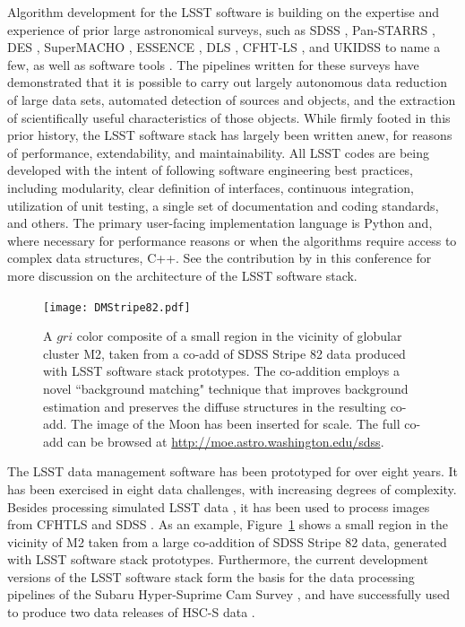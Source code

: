 \documentclass[11pt,twoside]{article}
\begin{document}
Algorithm development for the LSST software is building on the expertise
and experience of prior large astronomical surveys, such as
SDSS \citep{2000AJ....120.1579Y},
Pan-STARRS \citep{2006amos.confE..50M,2010SPIE.7733E..0EK},
DES \citep{DESDM},
SuperMACHO \citep{2005IAUS..225..357B},
ESSENCE \citep{2007ApJ...666..674M},
DLS \citep{2002SPIE.4836...73W},
CFHT-LS \citep{2012MNRAS.427..146H, 2013MNRAS.429.2858M, 2012AJ....143...38G},
and UKIDSS \citep{2007MNRAS.379.1599L}
to name a few, as well as software tools
\citep[e.g., SExtractor,][ascl:1010.064]{1996A&AS..117..393B}.
The pipelines written for these surveys have demonstrated that it is 
possible to carry out largely autonomous data reduction of large data 
sets, automated detection of sources and objects, and the
extraction of scientifically useful characteristics of those objects.
While firmly footed in this prior history, the LSST software stack has
largely been written anew, for reasons of performance, extendability, and
maintainability. All LSST codes are being developed with the intent of
following software engineering best practices, including modularity, clear definition
of interfaces, continuous integration,
utilization of unit testing, a single set of documentation and coding
standards, and others. The primary user-facing implementation language is Python and, where
necessary for performance reasons or when the algorithms require access to complex data structures, C++.
See the contribution by \citet{P056_adassxxv} in this conference for 
more discussion on the architecture of the LSST software stack.

\begin{figure}[!t]
%
%
\texttt{[image: DMStripe82.pdf]}
\caption{
A $gri$ color composite of a small region in the vicinity of globular cluster M2, taken from a co-add of
SDSS Stripe 82 data produced with LSST software stack prototypes.  The
co-addition employs a novel ``background matching" technique
\citep{2014MNRAS.440.1296H} that improves
background estimation and preserves the diffuse structures in the resulting
co-add. The image of the Moon has been inserted for scale. The full 
co-add can be browsed at \url{http://moe.astro.washington.edu/sdss}.}
\label{Fig:DMStripe82}
\end{figure}


The LSST data management software has been prototyped for over eight
years. It has been exercised in eight data challenges, with increasing
degrees of complexity. Besides processing simulated LSST data
\citep{2014SPIE.9150E..14C, 0067-0049-218-1-14}, it 
has been used to process images from CFHTLS
and SDSS \citep{2009ApJS..182..543A}. As an example,
Figure~\ref{Fig:DMStripe82} shows a small region in the vicinity of M2
taken from a large co-addition of SDSS Stripe 82 data, generated with LSST
software stack prototypes. Furthermore, the current development versions
of the LSST software stack form the basis for the data processing pipelines
of the Subaru Hyper-Suprime Cam Survey \citep{XXXX}, and have successfully
used to produce two data releases of HSC-S data \citep{XXX}.
\\
\end{document}
